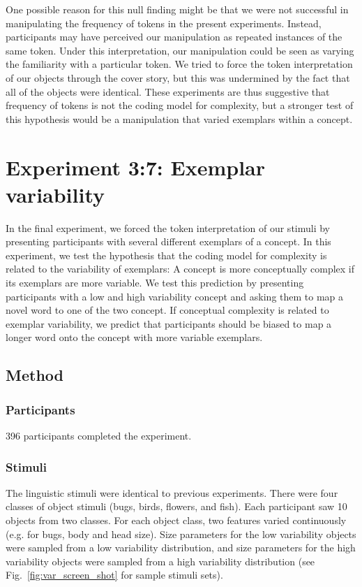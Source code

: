 One possible reason for this null finding might be that we were not successful in manipulating the frequency of tokens in the present experiments. Instead, participants may have perceived our manipulation as repeated instances of the same token. Under this interpretation, our manipulation could be seen as varying the familiarity with a particular token. We tried to force the token interpretation of our objects through the cover story, but this was undermined by the fact that all of the objects were identical. These experiments are thus  suggestive that frequency of tokens is not the coding model for complexity, but a stronger test of this hypothesis would be a manipulation that varied exemplars within a concept. 

\section{Experiment 3:7: Exemplar variability}
In the final experiment, we forced the token interpretation of our stimuli by presenting participants with several different exemplars of a concept. In this experiment, we test the hypothesis that the coding model for complexity is related to the variability of exemplars:  A concept is more conceptually complex if its exemplars are more variable. We test this prediction by presenting participants with a low and high variability concept and asking them to map a novel word to one of the two concept. If conceptual complexity is related to exemplar variability, we predict that participants should be biased to map a longer word onto the concept with more variable exemplars.

\subsection{Method}
\subsubsection{Participants}
396 participants completed the experiment.
\subsubsection{Stimuli}
The linguistic stimuli were identical to previous experiments. There were four classes of object stimuli (bugs, birds, flowers, and fish). Each participant saw 10 objects from two classes. For each object class, two features varied continuously (e.g. for bugs, body and head size). Size parameters for the low variability objects were  sampled from a low variability distribution, and size parameters for the high variability objects were  sampled from a high variability distribution (see Fig.\ \ref{fig:var_screen_shot} for sample stimuli sets).

